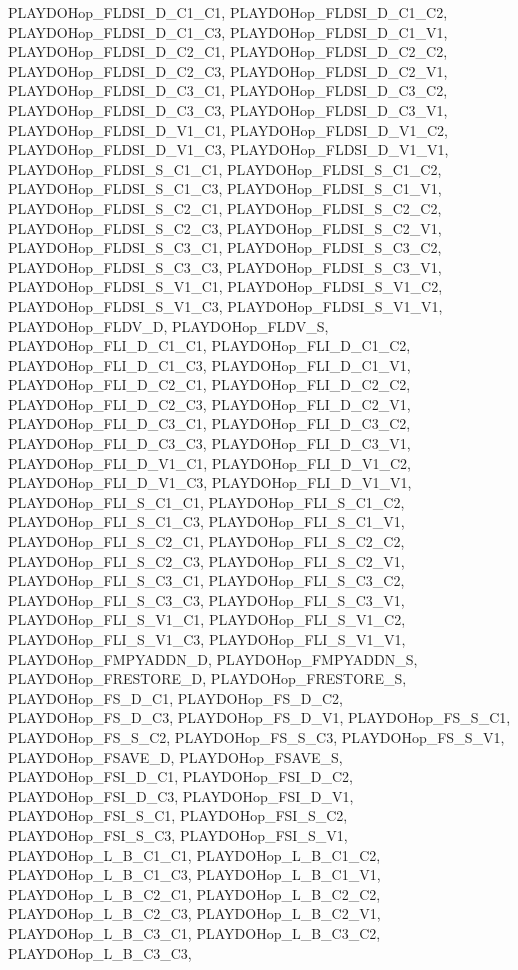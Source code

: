 PLAYDOHop\_\-FLDSI\_\-D\_\-C1\_\-C1, PLAYDOHop\_\-FLDSI\_\-D\_\-C1\_\-C2, PLAYDOHop\_\-FLDSI\_\-D\_\-C1\_\-C3, PLAYDOHop\_\-FLDSI\_\-D\_\-C1\_\-V1, PLAYDOHop\_\-FLDSI\_\-D\_\-C2\_\-C1, PLAYDOHop\_\-FLDSI\_\-D\_\-C2\_\-C2, PLAYDOHop\_\-FLDSI\_\-D\_\-C2\_\-C3, PLAYDOHop\_\-FLDSI\_\-D\_\-C2\_\-V1, PLAYDOHop\_\-FLDSI\_\-D\_\-C3\_\-C1, PLAYDOHop\_\-FLDSI\_\-D\_\-C3\_\-C2, PLAYDOHop\_\-FLDSI\_\-D\_\-C3\_\-C3, PLAYDOHop\_\-FLDSI\_\-D\_\-C3\_\-V1, PLAYDOHop\_\-FLDSI\_\-D\_\-V1\_\-C1, PLAYDOHop\_\-FLDSI\_\-D\_\-V1\_\-C2, PLAYDOHop\_\-FLDSI\_\-D\_\-V1\_\-C3, PLAYDOHop\_\-FLDSI\_\-D\_\-V1\_\-V1, PLAYDOHop\_\-FLDSI\_\-S\_\-C1\_\-C1, PLAYDOHop\_\-FLDSI\_\-S\_\-C1\_\-C2, PLAYDOHop\_\-FLDSI\_\-S\_\-C1\_\-C3, PLAYDOHop\_\-FLDSI\_\-S\_\-C1\_\-V1, PLAYDOHop\_\-FLDSI\_\-S\_\-C2\_\-C1, PLAYDOHop\_\-FLDSI\_\-S\_\-C2\_\-C2, PLAYDOHop\_\-FLDSI\_\-S\_\-C2\_\-C3, PLAYDOHop\_\-FLDSI\_\-S\_\-C2\_\-V1, PLAYDOHop\_\-FLDSI\_\-S\_\-C3\_\-C1, PLAYDOHop\_\-FLDSI\_\-S\_\-C3\_\-C2, PLAYDOHop\_\-FLDSI\_\-S\_\-C3\_\-C3, PLAYDOHop\_\-FLDSI\_\-S\_\-C3\_\-V1, PLAYDOHop\_\-FLDSI\_\-S\_\-V1\_\-C1, PLAYDOHop\_\-FLDSI\_\-S\_\-V1\_\-C2, PLAYDOHop\_\-FLDSI\_\-S\_\-V1\_\-C3, PLAYDOHop\_\-FLDSI\_\-S\_\-V1\_\-V1, PLAYDOHop\_\-FLDV\_\-D, PLAYDOHop\_\-FLDV\_\-S, PLAYDOHop\_\-FLI\_\-D\_\-C1\_\-C1, PLAYDOHop\_\-FLI\_\-D\_\-C1\_\-C2, PLAYDOHop\_\-FLI\_\-D\_\-C1\_\-C3, PLAYDOHop\_\-FLI\_\-D\_\-C1\_\-V1, PLAYDOHop\_\-FLI\_\-D\_\-C2\_\-C1, PLAYDOHop\_\-FLI\_\-D\_\-C2\_\-C2, PLAYDOHop\_\-FLI\_\-D\_\-C2\_\-C3, PLAYDOHop\_\-FLI\_\-D\_\-C2\_\-V1, PLAYDOHop\_\-FLI\_\-D\_\-C3\_\-C1, PLAYDOHop\_\-FLI\_\-D\_\-C3\_\-C2, PLAYDOHop\_\-FLI\_\-D\_\-C3\_\-C3, PLAYDOHop\_\-FLI\_\-D\_\-C3\_\-V1, PLAYDOHop\_\-FLI\_\-D\_\-V1\_\-C1, PLAYDOHop\_\-FLI\_\-D\_\-V1\_\-C2, PLAYDOHop\_\-FLI\_\-D\_\-V1\_\-C3, PLAYDOHop\_\-FLI\_\-D\_\-V1\_\-V1, PLAYDOHop\_\-FLI\_\-S\_\-C1\_\-C1, PLAYDOHop\_\-FLI\_\-S\_\-C1\_\-C2, PLAYDOHop\_\-FLI\_\-S\_\-C1\_\-C3, PLAYDOHop\_\-FLI\_\-S\_\-C1\_\-V1, PLAYDOHop\_\-FLI\_\-S\_\-C2\_\-C1, PLAYDOHop\_\-FLI\_\-S\_\-C2\_\-C2, PLAYDOHop\_\-FLI\_\-S\_\-C2\_\-C3, PLAYDOHop\_\-FLI\_\-S\_\-C2\_\-V1, PLAYDOHop\_\-FLI\_\-S\_\-C3\_\-C1, PLAYDOHop\_\-FLI\_\-S\_\-C3\_\-C2, PLAYDOHop\_\-FLI\_\-S\_\-C3\_\-C3, PLAYDOHop\_\-FLI\_\-S\_\-C3\_\-V1, PLAYDOHop\_\-FLI\_\-S\_\-V1\_\-C1, PLAYDOHop\_\-FLI\_\-S\_\-V1\_\-C2, PLAYDOHop\_\-FLI\_\-S\_\-V1\_\-C3, PLAYDOHop\_\-FLI\_\-S\_\-V1\_\-V1, PLAYDOHop\_\-FMPYADDN\_\-D, PLAYDOHop\_\-FMPYADDN\_\-S, PLAYDOHop\_\-FRESTORE\_\-D, PLAYDOHop\_\-FRESTORE\_\-S, PLAYDOHop\_\-FS\_\-D\_\-C1, PLAYDOHop\_\-FS\_\-D\_\-C2, PLAYDOHop\_\-FS\_\-D\_\-C3, PLAYDOHop\_\-FS\_\-D\_\-V1, PLAYDOHop\_\-FS\_\-S\_\-C1, PLAYDOHop\_\-FS\_\-S\_\-C2, PLAYDOHop\_\-FS\_\-S\_\-C3, PLAYDOHop\_\-FS\_\-S\_\-V1, PLAYDOHop\_\-FSAVE\_\-D, PLAYDOHop\_\-FSAVE\_\-S, PLAYDOHop\_\-FSI\_\-D\_\-C1, PLAYDOHop\_\-FSI\_\-D\_\-C2, PLAYDOHop\_\-FSI\_\-D\_\-C3, PLAYDOHop\_\-FSI\_\-D\_\-V1, PLAYDOHop\_\-FSI\_\-S\_\-C1, PLAYDOHop\_\-FSI\_\-S\_\-C2, PLAYDOHop\_\-FSI\_\-S\_\-C3, PLAYDOHop\_\-FSI\_\-S\_\-V1, PLAYDOHop\_\-L\_\-B\_\-C1\_\-C1, PLAYDOHop\_\-L\_\-B\_\-C1\_\-C2, PLAYDOHop\_\-L\_\-B\_\-C1\_\-C3, PLAYDOHop\_\-L\_\-B\_\-C1\_\-V1, PLAYDOHop\_\-L\_\-B\_\-C2\_\-C1, PLAYDOHop\_\-L\_\-B\_\-C2\_\-C2, PLAYDOHop\_\-L\_\-B\_\-C2\_\-C3, PLAYDOHop\_\-L\_\-B\_\-C2\_\-V1, PLAYDOHop\_\-L\_\-B\_\-C3\_\-C1, PLAYDOHop\_\-L\_\-B\_\-C3\_\-C2, PLAYDOHop\_\-L\_\-B\_\-C3\_\-C3, 